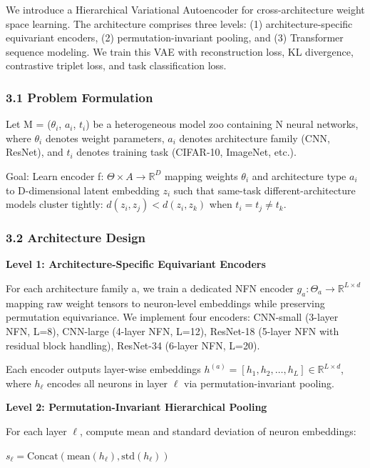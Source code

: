 
We introduce a Hierarchical Variational Autoencoder for cross-architecture weight space learning. The architecture comprises three levels: (1) architecture-specific equivariant encoders, (2) permutation-invariant pooling, and (3) Transformer sequence modeling. We train this VAE with reconstruction loss, KL divergence, contrastive triplet loss, and task classification loss.

\subsubsection{3.1 Problem Formulation}

Let M = {($\theta_i$, $a_i$, $t_i$)} be a heterogeneous model zoo containing N neural networks, where $\theta_i$ denotes weight parameters, $a_i$ denotes architecture family (CNN, ResNet), and $t_i$ denotes training task (CIFAR-10, ImageNet, etc.).

Goal: Learn encoder f: $\Theta \times A \rightarrow \mathbb{R}^D$ mapping weights $\theta_i$ and architecture type $a_i$ to D-dimensional latent embedding $z_i$ such that same-task different-architecture models cluster tightly: $d(z_i, z_j) < d(z_i, z_k)$ when $t_i = t_j \neq t_k$.

\subsubsection{3.2 Architecture Design}

\textbf{Level 1: Architecture-Specific Equivariant Encoders}

For each architecture family a, we train a dedicated NFN encoder $g_a: \Theta_a \rightarrow \mathbb{R}^{L \times d}$ mapping raw weight tensors to neuron-level embeddings while preserving permutation equivariance. We implement four encoders: CNN-small (3-layer NFN, L=8), CNN-large (4-layer NFN, L=12), ResNet-18 (5-layer NFN with residual block handling), ResNet-34 (6-layer NFN, L=20).

Each encoder outputs layer-wise embeddings $h^{(a)} = [h_1, h_2, \ldots, h_L] \in \mathbb{R}^{L \times d}$, where $h_\ell$ encodes all neurons in layer $\ell$ via permutation-invariant pooling.

\textbf{Level 2: Permutation-Invariant Hierarchical Pooling}

For each layer $\ell$, compute mean and standard deviation of neuron embeddings:

$s_\ell = \text{Concat}(\text{mean}(h_\ell), \text{std}(h_\ell))$

